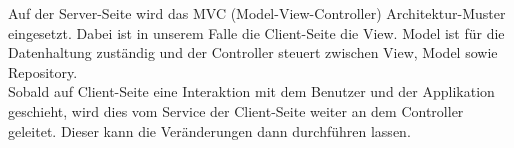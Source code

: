 Auf der Server-Seite wird das MVC (Model-View-Controller) Architektur-Muster eingesetzt. Dabei ist in unserem Falle die Client-Seite die View. Model ist für die Datenhaltung zuständig und der Controller steuert zwischen View, Model sowie Repository.  \\
Sobald auf Client-Seite eine Interaktion mit dem Benutzer und der Applikation geschieht, wird dies vom Service der Client-Seite weiter an dem Controller geleitet. Dieser kann die Veränderungen dann durchführen lassen.

